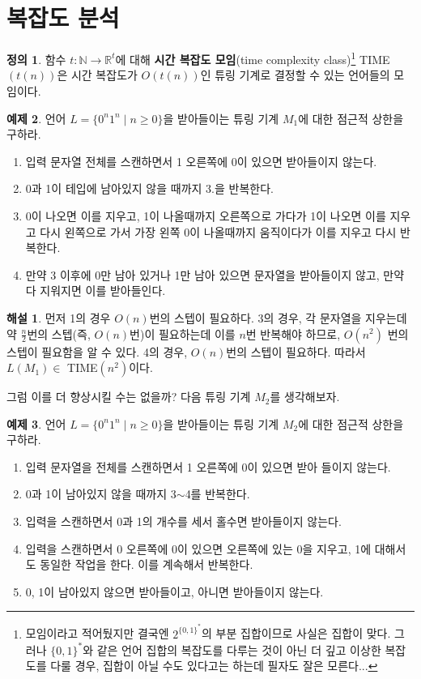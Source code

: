 \documentclass[b5paper, 11pt]{book}
\theoremstyle{definition}
\newtheorem{defn}{정의}[chapter]
\newtheorem{ex}[defn]{예제}
\newtheorem*{ans*}{해설}
\begin{document}
\section{복잡도 분석}\label{time complexity}
\begin{defn}
    함수 $t: \mathbb{N} \rightarrow \mathbb{R}^{t}$에 대해 \textbf{시간 복잡도 모임}(time complexity class)\footnote{모임이라고 적어뒀지만 결국엔 $2^{\{0,1\}^*}$의 부분 집합이므로 사실은 집합이 맞다. 그러나 $\{0,1\}^*$와 같은 언어 집합의 복잡도를 다루는 것이 아닌 더 깊고 이상한 복잡도를 다룰 경우, 집합이 아닐 수도 있다고는 하는데 필자도 잘은 모른다...} TIME$(t(n))$은 시간 복잡도가 $O(t(n))$인 튜링 기계로 결정할 수 있는 언어들의 모임이다. 
\end{defn}
\begin{ex}
    언어 $L = \{0^n1^n \;\vert\; n \ge 0\}$을 받아들이는 튜링 기계 $M_1$에 대한 점근적 상한을 구하라.
    \begin{enumerate}
        \item 입력 문자열 전체를 스캔하면서 1 오른쪽에 0이 있으면 받아들이지 않는다. 
        \item 0과 1이 테입에 남아있지 않을 때까지 3.을 반복한다. 
        \item 0이 나오면 이를 지우고, 1이 나올때까지 오른쪽으로 가다가 1이 
        나오면 이를 지우고 다시 왼쪽으로 가서 가장 왼쪽 0이 나올때까지 움직이다가 이를 지우고 다시 반복한다. 
        \item 만약 3 이후에 0만 남아 있거나 1만 남아 있으면 문자열을 받아들이지 않고, 만약 다 지워지면 이를 받아들인다. 
    \end{enumerate} 
\end{ex}
\begin{ans*}
먼저 1의 경우 $O(n)$번의 스텝이 필요하다. 3의 경우, 각 문자열을 지우는데 약 $\frac{n}{2}$번의 스텝(즉, $O(n)$번)이 필요하는데 이를 $n$번 반복해야 하므로, $O(n^2)$ 번의 스텝이 필요함을 알 수 있다. 4의 경우, $O(n)$번의 스텝이 필요하다. 따라서 $L(M_1) \in$ TIME$(n^2)$이다.
\end{ans*} 
그럼 이를 더 향상시킬 수는 없을까? 다음 튜링 기계 $M_2$를 생각해보자. 
\begin{ex} \label{nlogn regular}
    언어 $L = \{0^n1^n \;\vert\; n \ge 0\}$을 받아들이는 튜링 기계 $M_2$에 대한 점근적 상한을 구하라. 
    \begin{enumerate}
        \item 입력 문자열을 전체를 스캔하면서 1 오른쪽에 0이 있으면 받아 들이지 않는다. 
        \item 0과 1이 남아있지 않을 때까지 3$\sim$4를 반복한다.
        \item 입력을 스캔하면서 0과 1의 개수를 세서 홀수면 받아들이지 않는다.
        \item 입력을 스캔하면서 0 오른쪽에 0이 있으면 오른쪽에 있는 0을 지우고, 1에 대해서도 동일한 작업을 한다. 이를 계속해서 반복한다.
        \item 0, 1이 남아있지 않으면 받아들이고, 아니면 받아들이지 않는다.
    \end{enumerate}
\end{ex}
\end{document}
